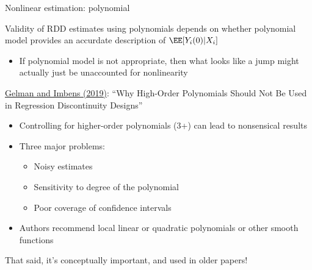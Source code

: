 \begin{frame}{Nonlinear estimation: polynomial}


Validity of RDD estimates using polynomials depends on whether polynomial model provides an accurdate description of $\EE[Y_i (0) \vert X_i]$
\begin{itemize}
    \item If polynomial model is not appropriate, then what looks like a jump might actually just be unaccounted for nonlinearity
\end{itemize}

\vspace{3ex}
\href{https://doi.org/10.1080/07350015.2017.1366909}{Gelman and Imbens (2019)}: ``Why High-Order Polynomials Should Not Be Used in Regression Discontinuity Designs''
\begin{itemize}
    \item Controlling for higher-order polynomials (3+) can lead to nonsensical results
    \item Three major problems: 
    \begin{itemize}
        \item Noisy estimates
        \item Sensitivity to degree of the polynomial
        \item Poor coverage of confidence intervals
    \end{itemize}
    \item Authors recommend local linear or quadratic polynomials or other smooth functions
\end{itemize}

\vspace{3ex}
That said, it's conceptually important, and used in older papers!

\end{frame}

